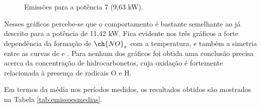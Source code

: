 \begin{figure}[!ht]
	\centering
	\caption{Emissões para a potência 7 (9,63 kW).}
	\label{fig:emissoespot7}
\end{figure}

Nesses gráficos percebe-se que o comportamento é bastante semelhante ao já descrito para a potência de 11,42 kW. Fica evidente nos três gráficos a forte dependência da formação de $\ch{NO}_x$ com a temperatura, e também a simetria entre as curvas de  e . Para nenhum dos gráficos foi obtida uma conclusão precisa acerca da concentração de hidrocarbonetos, cuja oxidação é fortemente relacionada à presença de radicais O e H. 

Em termos da média nos períodos medidos, os resultados obtidos são mostrados na Tabela \ref{tab:emissoesmedias}.


